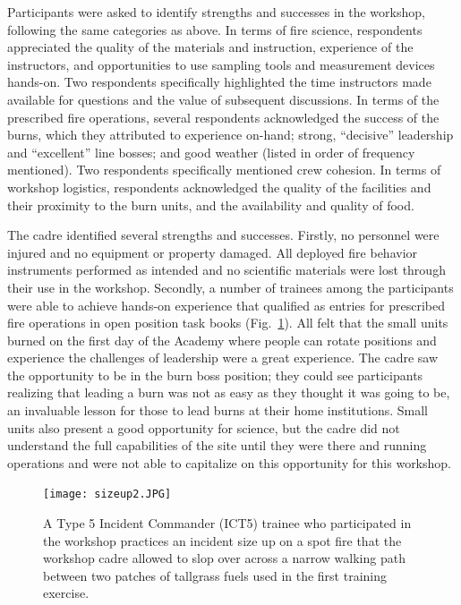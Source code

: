 \documentclass[fire,article,submit,moreauthors,pdftex]{Definitions/mdpi}
\begin{document}
Participants were asked to identify strengths and successes in the workshop, following the same categories as above.
In terms of fire science, respondents appreciated the quality of the materials and instruction, experience of the instructors, and opportunities to use sampling tools and measurement devices hands-on.
Two respondents specifically highlighted the time instructors made available for questions and the value of subsequent discussions.
In terms of the prescribed fire operations, several respondents acknowledged the success of the burns, which they attributed to experience on-hand; strong, ``decisive'' leadership and ``excellent'' line bosses; and good weather (listed in order of frequency mentioned).
Two respondents specifically mentioned crew cohesion.
In terms of workshop logistics, respondents acknowledged the quality of the facilities and their proximity to the burn units, and the availability and quality of food.

The cadre identified several strengths and successes.
Firstly, no personnel were injured and no equipment or property damaged.
All deployed fire behavior instruments performed as intended and no scientific materials were lost through their use in the workshop.
Secondly, a number of trainees among the participants were able to achieve hands-on experience that qualified as entries for prescribed fire operations in open position task books (Fig.~\ref{sizeup}).
All felt that the small units burned on the first day of the Academy where people can rotate positions and experience the challenges of leadership were a great experience.
The cadre saw the opportunity to be in the burn boss position; they could see participants realizing that leading a burn was not as easy as they thought it was going to be, an invaluable lesson for those to lead burns at their home institutions.
Small units also present a good opportunity for science, but the cadre did not understand the full capabilities of the site until they were there and running operations and were not able to capitalize on this opportunity for this workshop.

\begin{figure}
\centering
\texttt{[image: sizeup2.JPG]}
\caption{A Type 5 Incident Commander (ICT5) trainee who participated in the workshop practices an incident size up on a spot fire that the workshop cadre allowed to slop over across a narrow walking path between two patches of tallgrass fuels used in the first training exercise. \label{sizeup}}
\end{figure}
\end{document}

